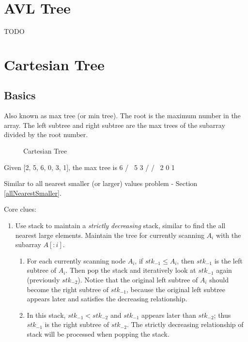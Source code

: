 \section{AVL Tree}
TODO

\section{Cartesian Tree}
\subsection{Basics}
Also known as max tree (or min tree). The root is the maximum number in the array. The left subtree and right subtree are the max trees of the subarray divided by the root number.
\begin{figure}[hbtp]
\centering
{}
\caption{Cartesian Tree}
\label{fig:cartesianTree}
\end{figure}
\begin{java}
Given [2, 5, 6, 0, 3, 1], the max tree is
     6
    / \
   5   3
  /   / \
 2   0   1
\end{java}
 Similar to all nearest smaller (or larger) values problem - Section \ref{allNearestSmaller}.

Core clues:
\begin{enumerate}
\item Use stack to maintain a \textit{strictly decreasing} stack, similar to find the all nearest large elements.
\itm Maintain the tree for currently scanning $A_i$ with the subarray $A[:i]$.
\begin{enumerate}
\item \rih{Left tree.} For each currently scanning node $A_i$, if ${stk}_{-1} \leq A_i$, then ${stk}_{-1}$ is the left subtree of $A_i$. Then pop the stack and iteratively look at ${stk}_{-1}$ again (previously ${stk}_{-2}$). Notice that the original left subtree of $A_i$ should become the right subtree of ${stk}_{-1} $, because the original left subtree appears later and satisfies the decreasing relationship.
\item {} In this stack, ${stk}_{-1} < {stk}_{-2}$ and ${stk}_{-1}$ appears later than ${stk}_{-2}$; thus ${stk}_{-1}$ is the right subtree of ${stk}_{-2}$. The strictly decreasing relationship of stack will be processed when popping the stack. 
\end{enumerate}
\end{enumerate}

